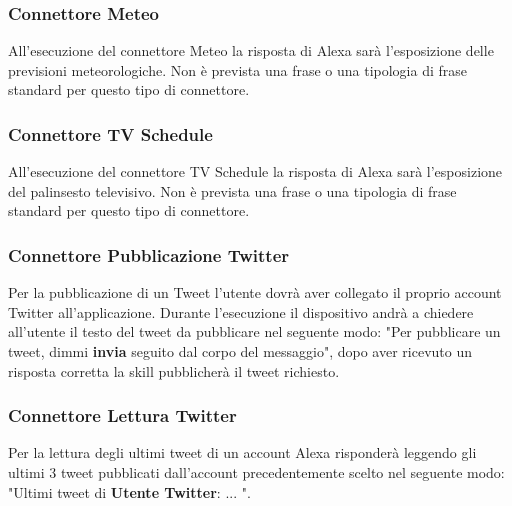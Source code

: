 \subsubsection{Connettore Meteo}
All'esecuzione del connettore Meteo la risposta di Alexa sarà l'esposizione delle previsioni meteorologiche. Non è prevista una frase o una tipologia di frase standard per questo tipo di connettore.
\subsubsection{Connettore TV Schedule}
All'esecuzione del connettore TV Schedule la risposta di Alexa sarà l'esposizione del palinsesto televisivo. Non è prevista una frase o una tipologia di frase standard per questo tipo di connettore.
\subsubsection{Connettore Pubblicazione Twitter}
Per la pubblicazione di un Tweet l'utente dovrà aver collegato il proprio account Twitter all'applicazione.
Durante l'esecuzione il dispositivo andrà a chiedere all'utente il testo del tweet da pubblicare nel seguente modo: "Per pubblicare un tweet, dimmi \textbf{invia} seguito dal corpo del messaggio", dopo aver ricevuto un risposta corretta la skill pubblicherà il tweet richiesto.
\subsubsection{Connettore Lettura Twitter}
Per la lettura degli ultimi tweet di un account Alexa risponderà leggendo gli ultimi 3 tweet pubblicati dall'account precedentemente scelto nel seguente modo: "Ultimi tweet di \textbf{Utente Twitter}: ... ".
